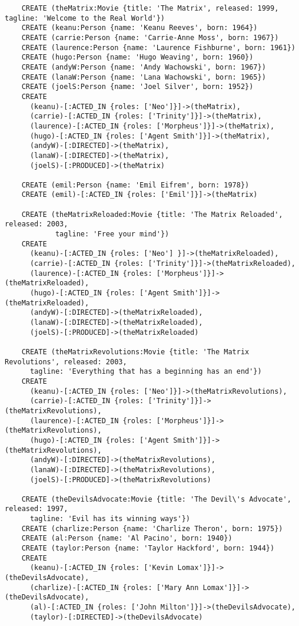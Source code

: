 	\begin{lstlisting}
	CREATE (theMatrix:Movie {title: 'The Matrix', released: 1999, tagline: 'Welcome to the Real World'})
	CREATE (keanu:Person {name: 'Keanu Reeves', born: 1964})
	CREATE (carrie:Person {name: 'Carrie-Anne Moss', born: 1967})
	CREATE (laurence:Person {name: 'Laurence Fishburne', born: 1961})
	CREATE (hugo:Person {name: 'Hugo Weaving', born: 1960})
	CREATE (andyW:Person {name: 'Andy Wachowski', born: 1967})
	CREATE (lanaW:Person {name: 'Lana Wachowski', born: 1965})
	CREATE (joelS:Person {name: 'Joel Silver', born: 1952})
	CREATE
	  (keanu)-[:ACTED_IN {roles: ['Neo']}]->(theMatrix),
	  (carrie)-[:ACTED_IN {roles: ['Trinity']}]->(theMatrix),
	  (laurence)-[:ACTED_IN {roles: ['Morpheus']}]->(theMatrix),
	  (hugo)-[:ACTED_IN {roles: ['Agent Smith']}]->(theMatrix),
	  (andyW)-[:DIRECTED]->(theMatrix),
	  (lanaW)-[:DIRECTED]->(theMatrix),
	  (joelS)-[:PRODUCED]->(theMatrix)
	
	CREATE (emil:Person {name: 'Emil Eifrem', born: 1978})
	CREATE (emil)-[:ACTED_IN {roles: ['Emil']}]->(theMatrix)
	
	CREATE (theMatrixReloaded:Movie {title: 'The Matrix Reloaded', released: 2003,
	        tagline: 'Free your mind'})
	CREATE
	  (keanu)-[:ACTED_IN {roles: ['Neo'] }]->(theMatrixReloaded),
	  (carrie)-[:ACTED_IN {roles: ['Trinity']}]->(theMatrixReloaded),
	  (laurence)-[:ACTED_IN {roles: ['Morpheus']}]->(theMatrixReloaded),
	  (hugo)-[:ACTED_IN {roles: ['Agent Smith']}]->(theMatrixReloaded),
	  (andyW)-[:DIRECTED]->(theMatrixReloaded),
	  (lanaW)-[:DIRECTED]->(theMatrixReloaded),
	  (joelS)-[:PRODUCED]->(theMatrixReloaded)
	
	CREATE (theMatrixRevolutions:Movie {title: 'The Matrix Revolutions', released: 2003,
	  tagline: 'Everything that has a beginning has an end'})
	CREATE
	  (keanu)-[:ACTED_IN {roles: ['Neo']}]->(theMatrixRevolutions),
	  (carrie)-[:ACTED_IN {roles: ['Trinity']}]->(theMatrixRevolutions),
	  (laurence)-[:ACTED_IN {roles: ['Morpheus']}]->(theMatrixRevolutions),
	  (hugo)-[:ACTED_IN {roles: ['Agent Smith']}]->(theMatrixRevolutions),
	  (andyW)-[:DIRECTED]->(theMatrixRevolutions),
	  (lanaW)-[:DIRECTED]->(theMatrixRevolutions),
	  (joelS)-[:PRODUCED]->(theMatrixRevolutions)
	
	CREATE (theDevilsAdvocate:Movie {title: 'The Devil\'s Advocate', released: 1997,
	  tagline: 'Evil has its winning ways'})
	CREATE (charlize:Person {name: 'Charlize Theron', born: 1975})
	CREATE (al:Person {name: 'Al Pacino', born: 1940})
	CREATE (taylor:Person {name: 'Taylor Hackford', born: 1944})
	CREATE
	  (keanu)-[:ACTED_IN {roles: ['Kevin Lomax']}]->(theDevilsAdvocate),
	  (charlize)-[:ACTED_IN {roles: ['Mary Ann Lomax']}]->(theDevilsAdvocate),
	  (al)-[:ACTED_IN {roles: ['John Milton']}]->(theDevilsAdvocate),
	  (taylor)-[:DIRECTED]->(theDevilsAdvocate)
	

\end{lstlisting}
